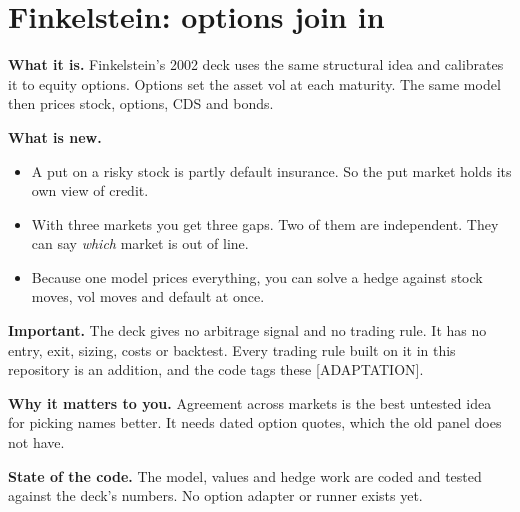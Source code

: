 \documentclass[11pt]{article}
\newcommand{\term}[1]{\textbf{#1}}
\begin{document}
\section{Finkelstein: options join in}\label{sec:fink}

\begin{plainbox}
\term{What it is.} Finkelstein's 2002 deck uses the same structural idea and calibrates it to equity options. Options set the asset vol at each maturity. The same model then prices stock, options, CDS and bonds.

\term{What is new.}
\begin{itemize}[leftmargin=1.2em,nosep]
\item A put on a risky stock is partly default insurance. So the put market holds its own view of credit.
\item With three markets you get three gaps. Two of them are independent. They can say \emph{which} market is out of line.
\item Because one model prices everything, you can solve a hedge against stock moves, vol moves and default at once.
\end{itemize}

\term{Important.} The deck gives no arbitrage signal and no trading rule. It has no entry, exit, sizing, costs or backtest. Every trading rule built on it in this repository is an addition, and the code tags these [ADAPTATION].

\term{Why it matters to you.} Agreement across markets is the best untested idea for picking names better. It needs dated option quotes, which the old panel does not have.

\term{State of the code.} The model, values and hedge work are coded and tested against the deck's numbers. No option adapter or runner exists yet.
\end{plainbox}
\end{document}
